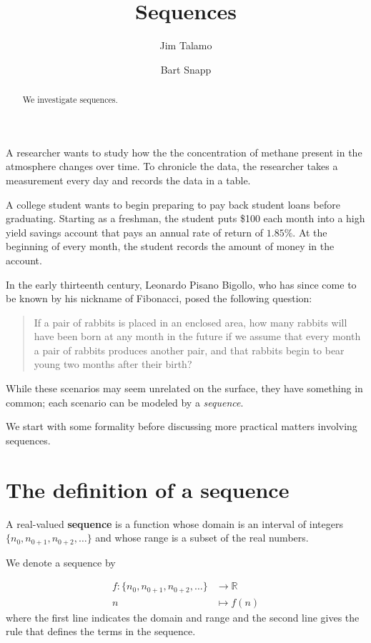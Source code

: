 \documentclass{ximera}
\author{Jim Talamo \and Bart Snapp}
\title[Dig-In:]{Sequences}
\begin{document}
\begin{abstract}
We investigate sequences.
\end{abstract}
\maketitle

A researcher wants to study how the the concentration of methane present in the atmosphere changes over time.  To chronicle the data, the researcher takes a measurement every day and records the data in a table.

A college student wants to begin preparing to pay back student loans before graduating.  Starting as a freshman, the student puts \$100 each month into a high yield savings account that pays an annual rate of return of $1.85\%$.  At the beginning of every month, the student records the amount of money in the account.

In the early thirteenth century, Leonardo Pisano Bigollo, who has since come to be known by his nickname of Fibonacci, posed the following question:

\begin{quote}
If a pair of rabbits is placed in an enclosed area, how many rabbits will have been born at any month in the future if we assume that every month a pair of rabbits produces another pair, and that rabbits begin to bear young two months after their birth?  
\end{quote}

While these scenarios may seem unrelated on the surface, they have something in common; each scenario can be modeled by a \emph{sequence}.

We start with some formality before discussing more practical matters involving sequences.

\section{The definition of a sequence}

\begin{definition} 
A real-valued \textbf{sequence} is a function whose domain is an interval of integers $\{n_0,n_{0+1},n_{0+2}, \ldots\}$ and whose range is a subset of the real numbers.  

We denote a sequence by 

\begin{align*}
f : \{n_0,n_{0+1},n_{0+2}, \ldots\} & \to \mathbb R \\
    n &\mapsto f(n)
\end{align*}
where the first line indicates the domain and range and the second line gives the rule that defines the terms in the sequence.
\end{definition}
\end{document}
